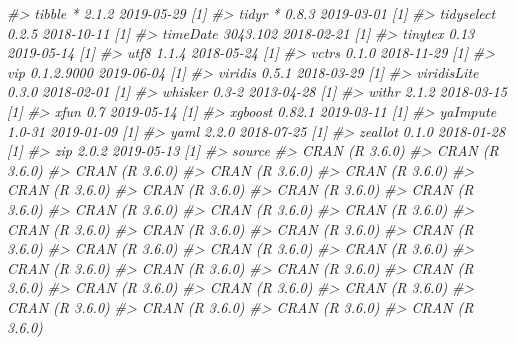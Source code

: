 \documentclass[]{krantz}
\makeatletter
\newenvironment{Shaded}{\begin{snugshade}}{\end{snugshade}}
\newcommand{\CommentTok}[1]{\textcolor[rgb]{0.37,0.37,0.37}{\textit{#1}}}
\newenvironment{kframe}{%
\medskip{}
\setlength{\fboxsep}{.8em}
 \def\at@end@of@kframe{}%
 \ifinner\ifhmode%
  \def\at@end@of@kframe{\end{minipage}}%
  \begin{minipage}{\columnwidth}%
 \fi\fi%
 \def\FrameCommand##1{\hskip\@totalleftmargin \hskip-\fboxsep
 \colorbox{shadecolor}{##1}\hskip-\fboxsep
     \hskip-\linewidth \hskip-\@totalleftmargin \hskip\columnwidth}%
 \MakeFramed {\advance\hsize-\width
   \@totalleftmargin\z@ \linewidth\hsize
   \@setminipage}}%
 {\par\unskip\endMakeFramed%
 \at@end@of@kframe}
\renewenvironment{Shaded}{\begin{kframe}}{\end{kframe}}
\makeatother
\begin{document}
\begin{Shaded}
\begin{Highlighting}[]
\CommentTok{#>    tibble        * 2.1.2      2019-05-29 [1]}
\CommentTok{#>    tidyr         * 0.8.3      2019-03-01 [1]}
\CommentTok{#>    tidyselect      0.2.5      2018-10-11 [1]}
\CommentTok{#>    timeDate        3043.102   2018-02-21 [1]}
\CommentTok{#>    tinytex         0.13       2019-05-14 [1]}
\CommentTok{#>    utf8            1.1.4      2018-05-24 [1]}
\CommentTok{#>    vctrs           0.1.0      2018-11-29 [1]}
\CommentTok{#>    vip             0.1.2.9000 2019-06-04 [1]}
\CommentTok{#>    viridis         0.5.1      2018-03-29 [1]}
\CommentTok{#>    viridisLite     0.3.0      2018-02-01 [1]}
\CommentTok{#>    whisker         0.3-2      2013-04-28 [1]}
\CommentTok{#>    withr           2.1.2      2018-03-15 [1]}
\CommentTok{#>    xfun            0.7        2019-05-14 [1]}
\CommentTok{#>    xgboost         0.82.1     2019-03-11 [1]}
\CommentTok{#>    yaImpute        1.0-31     2019-01-09 [1]}
\CommentTok{#>    yaml            2.2.0      2018-07-25 [1]}
\CommentTok{#>    zeallot         0.1.0      2018-01-28 [1]}
\CommentTok{#>    zip             2.0.2      2019-05-13 [1]}
\CommentTok{#>  source                         }
\CommentTok{#>  CRAN (R 3.6.0)                 }
\CommentTok{#>  CRAN (R 3.6.0)                 }
\CommentTok{#>  CRAN (R 3.6.0)                 }
\CommentTok{#>  CRAN (R 3.6.0)                 }
\CommentTok{#>  CRAN (R 3.6.0)                 }
\CommentTok{#>  CRAN (R 3.6.0)                 }
\CommentTok{#>  CRAN (R 3.6.0)                 }
\CommentTok{#>  CRAN (R 3.6.0)                 }
\CommentTok{#>  CRAN (R 3.6.0)                 }
\CommentTok{#>  CRAN (R 3.6.0)                 }
\CommentTok{#>  CRAN (R 3.6.0)                 }
\CommentTok{#>  CRAN (R 3.6.0)                 }
\CommentTok{#>  CRAN (R 3.6.0)                 }
\CommentTok{#>  CRAN (R 3.6.0)                 }
\CommentTok{#>  CRAN (R 3.6.0)                 }
\CommentTok{#>  CRAN (R 3.6.0)                 }
\CommentTok{#>  CRAN (R 3.6.0)                 }
\CommentTok{#>  CRAN (R 3.6.0)                 }
\CommentTok{#>  CRAN (R 3.6.0)                 }
\CommentTok{#>  CRAN (R 3.6.0)                 }
\CommentTok{#>  CRAN (R 3.6.0)                 }
\CommentTok{#>  CRAN (R 3.6.0)                 }
\CommentTok{#>  CRAN (R 3.6.0)                 }
\CommentTok{#>  CRAN (R 3.6.0)                 }
\CommentTok{#>  CRAN (R 3.6.0)                 }
\CommentTok{#>  CRAN (R 3.6.0)                 }
\CommentTok{#>  CRAN (R 3.6.0)                 }
\CommentTok{#>  CRAN (R 3.6.0)                 }
\CommentTok{#>  CRAN (R 3.6.0)                 }
\CommentTok{#>  CRAN (R 3.6.0)                 }

\end{Highlighting}
\end{Shaded}
\end{document}
